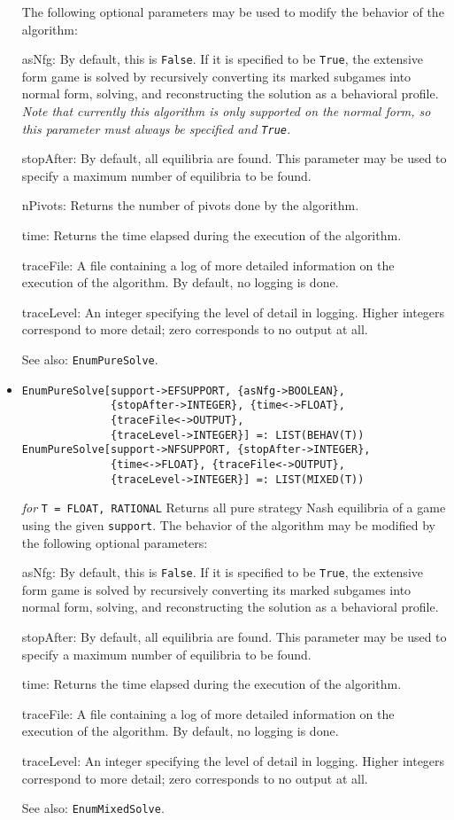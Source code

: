 \begin{itemize}
The following optional parameters may be used to modify the behavior
of the algorithm:
\bd
\item
[asNfg:] By default, this is \verb+False+.  If it is specified to be
\verb+True+, the extensive form game is solved by recursively converting
its marked subgames into normal form, solving, and reconstructing the
solution as a behavioral profile.  {\it Note that currently this algorithm
is only supported on the normal form, so this parameter
must always be specified and {\tt True}.} 
\item
[stopAfter:] By default, all equilibria are found.  This parameter may
be used to specify a maximum number of equilibria to be found.
\item
[nPivots:] Returns the number of pivots done by the
algorithm.
\item
[time:] Returns the time elapsed during the execution
of the algorithm.
\item
[traceFile:] A file containing a log of more detailed information on the
execution of the algorithm.  By default, no logging is done.
\item
[traceLevel:] An integer specifying the level of detail in logging.
Higher integers correspond to more detail; zero corresponds to no output
at all.
\ed
\item [See also:] \verb+EnumPureSolve+.
\ed

\item
\protect \large \begin{verbatim}
EnumPureSolve[support->EFSUPPORT, {asNfg->BOOLEAN},
              {stopAfter->INTEGER}, {time<->FLOAT},
              {traceFile<->OUTPUT},
              {traceLevel->INTEGER}] =: LIST(BEHAV(T))
EnumPureSolve[support->NFSUPPORT, {stopAfter->INTEGER},
              {time<->FLOAT}, {traceFile<->OUTPUT},
              {traceLevel->INTEGER}] =: LIST(MIXED(T)) 
\end{verbatim}\normalsize

{\it for} {\tt T = FLOAT, RATIONAL}
\bd
Returns all pure strategy Nash equilibria of a game using the given
\verb+support+.  The behavior
of the algorithm may be modified by the following optional parameters:
\bd
\item
[asNfg:] By default, this is \verb+False+.  If it is specified to be
\verb+True+, the extensive form game is solved by recursively converting
its marked subgames into normal form, solving, and reconstructing the
solution as a behavioral profile.
\item
[stopAfter:] By default, all equilibria are found.  This parameter may
be used to specify a maximum number of equilibria to be found.
\item
[time:] Returns the time elapsed during the execution
of the algorithm.
\item
[traceFile:] A file containing a log of more detailed information on the
execution of the algorithm.  By default, no logging is done.
\item
[traceLevel:] An integer specifying the level of detail in logging.  Higher
integers correspond to more detail; zero corresponds to no output at all.
\ed
\item
[See also:] \verb+EnumMixedSolve+.
\ed


\end{itemize}
